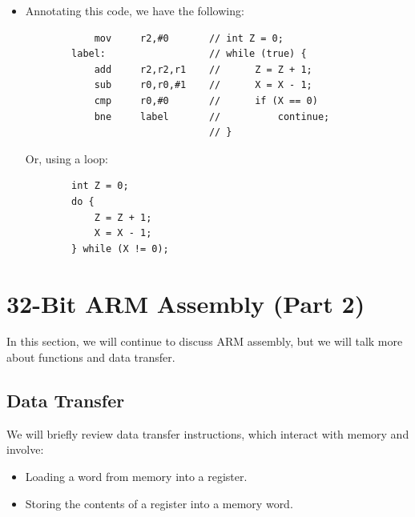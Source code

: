 \documentclass[letterpaper]{article}
\begin{document}
\begin{itemize}
    \item Annotating this code, we have the following:
    \begin{verbatim}
            mov     r2,#0       // int Z = 0;
        label:                  // while (true) {
            add     r2,r2,r1    //      Z = Z + 1;
            sub     r0,r0,#1    //      X = X - 1;
            cmp     r0,#0       //      if (X == 0) 
            bne     label       //          continue;
                                // } 
    \end{verbatim}
    Or, using a  loop:
    \begin{verbatim}
        int Z = 0;
        do {
            Z = Z + 1;
            X = X - 1;
        } while (X != 0);
    \end{verbatim}
\end{itemize}


\newpage 

\section{32-Bit ARM Assembly (Part 2)}
In this section, we will continue to discuss ARM assembly, but we will talk more about functions and data transfer. 

\subsection{Data Transfer}
We will briefly review data transfer instructions, which interact with memory and involve:
\begin{itemize}
    \item Loading a word from memory into a register. 
    \item Storing the contents of a register into a memory word.
\end{itemize}
\end{document}
